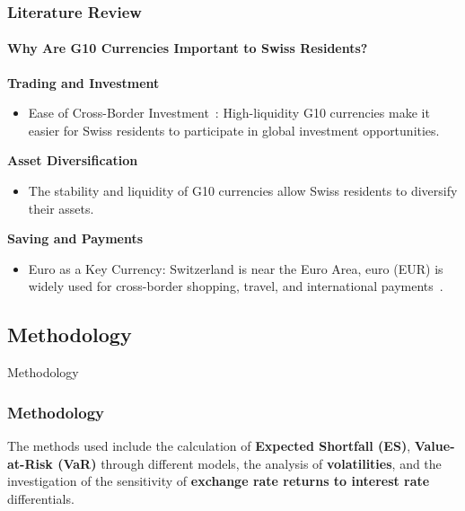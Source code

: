 \documentclass[10pt]{beamer}
\begin{document}
\begin{frame}
\frametitle{Literature Review}
\framesubtitle{Why Are G10 Currencies Important to Swiss Residents?}
\textbf{Trading and Investment}
\begin{itemize}
    \item Ease of Cross-Border Investment~\cite{rogoff2000six}: High-liquidity G10 currencies make it easier for Swiss residents to participate in global investment opportunities.  
\end{itemize}
\textbf{Asset Diversification} 
\begin{itemize}
    \item The stability and liquidity of G10 currencies allow Swiss residents to diversify their assets. ~\cite{ito2020currency}
\end{itemize}
\textbf{Saving and Payments}
\begin{itemize}
    \item Euro as a Key Currency: Switzerland is near the Euro Area, euro (EUR) is widely used for cross-border shopping, travel, and international payments~\cite{sif_imf_reports}.
\end{itemize}
\end{frame}
\begin{frame}
\section{Methodology}
\centering \LARGE Methodology
\end{frame}
\begin{frame}
\frametitle{Methodology}
The methods used include the calculation of \textbf{Expected Shortfall (ES)}, \textbf{Value-at-Risk (VaR)} through different models, the analysis of \textbf{volatilities}, and the investigation of the sensitivity of \textbf{exchange rate returns to interest rate} differentials.
\end{frame}
\end{document}
